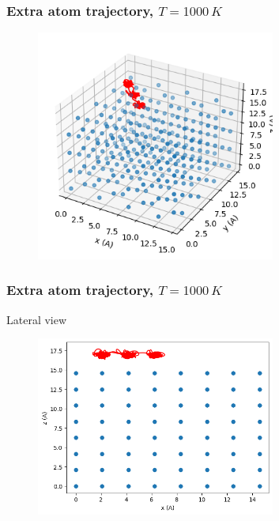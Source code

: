 \documentclass{beamer}
\begin{document}
\begin{frame}
    \frametitle{Extra atom trajectory, $T=1000\,K$}

    \begin{figure}
        \includegraphics[width=0.7\textwidth]{images/extra1000k3d.png}
    \end{figure}

\end{frame}

\begin{frame}
    \frametitle{Extra atom trajectory, $T=1000\,K$}

    \centering Lateral view
    \begin{figure}
        \includegraphics[width=0.7\textwidth]{images/extra1000klateral.png}
    \end{figure}

\end{frame}
\end{document}
